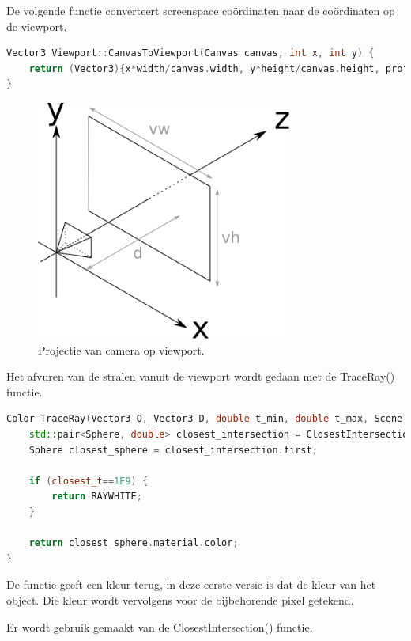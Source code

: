 \documentclass[12pt, a4paper]{article}
\begin{document}
De volgende functie converteert screenspace coördinaten naar de coördinaten op de viewport.
\begin{lstlisting}[language=C++]
Vector3 Viewport::CanvasToViewport(Canvas canvas, int x, int y) {
    return (Vector3){x*width/canvas.width, y*height/canvas.height, projection_plane_distance};
}
\end{lstlisting}

\begin{figure}[H]
    \centering
    \includegraphics[width=0.75\textwidth]{viewport.png}
    \caption{Projectie van camera op viewport.}
    \label{fig:viewport}
\end{figure}

Het afvuren van de stralen vanuit de viewport wordt gedaan met de TraceRay() functie.

\begin{lstlisting}[language=C++]
Color TraceRay(Vector3 O, Vector3 D, double t_min, double t_max, Scene scene) {   
    std::pair<Sphere, double> closest_intersection = ClosestIntersection(O, D, t_min, t_max, scene);
    Sphere closest_sphere = closest_intersection.first;

    if (closest_t==1E9) {
        return RAYWHITE;
    }

    return closest_sphere.material.color;
}
\end{lstlisting}

De functie geeft een kleur terug, in deze eerste versie is dat de kleur van het object. Die kleur wordt vervolgens voor de bijbehorende pixel getekend.

Er wordt gebruik gemaakt van de ClosestIntersection() functie. 
\end{document}
